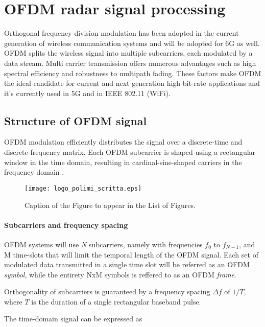 \chapter{OFDM radar signal processing}
\label{chap_OFDM}

Orthogonal frequency division modulation has been adopted in the current generation of wireless communication systems and will be adopted for 6G as well.
OFDM splits the wireless signal into multiple subcarriers, each modulated by a data stream. Multi carrier transmission offers numerous advantages such as high spectral efficiency and robustness to multipath fading. These factors make OFDM the ideal candidate for current and next generation high bit-rate applications and it's currently used in 5G and in IEEE 802.11 (WiFi).



\section{Structure of OFDM signal}

OFDM modulation efficiently distributes the signal over a discrete-time and discrete-frequency matrix. Each OFDM subcarrier is shaped using a rectangular window in the time domain, resulting in cardinal-sine-shaped carriers in the frequency domain \cite{Schaich_Wild_2014}.

\begin{figure}[H]
    \centering
    \texttt{[image: logo\_polimi\_scritta.eps]}
    \caption{Caption of the Figure to appear in the List of Figures.}
    \label{fig:quadtree}
\end{figure}

\subsubsection{Subcarriers and frequency spacing}
OFDM systems will use \textit{N} subcarriers, namely with frequencies $f_0$ to $f_{N-1}$, and M time-slots that will limit the temporal length of the OFDM signal.
Each set of modulated data transmitted in a single time slot will be referred as an OFDM \textit{symbol}, while the entirety NxM symbols is reffered to as an OFDM \textit{frame}.

Orthogonality of subcarriers is guaranteed by a frequency spacing $\Delta f$ of $1/T$, where $T$ is the duration of a single rectangular baseband pulse.

The time-domain signal can be expressed as

